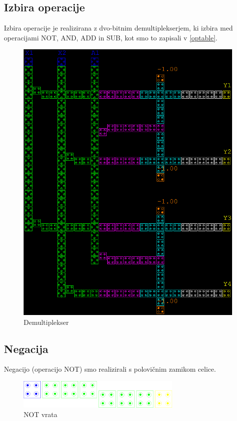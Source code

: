 \documentclass[seminar, slovene]{FRIreport}
\begin{document}
\subsection{Izbira operacije}
Izbira operacije je realizirana z dvo-bitnim demultiplekserjem, ki izbira med operacijami NOT, AND, ADD in SUB, kot smo to zapisali v \autoref{optable}.
\begin{figure}[h!]
\includegraphics[width=15cm]{qca/img/demux}
\caption{Demultiplekser}
\label{demux}
\end{figure}

\subsection{Negacija}
Negacijo (operacijo NOT) smo realizirali s polovičnim zamikom celice.
\begin{figure}[h!]
\begin{center}
\includegraphics[width=8cm]{qca/img/NOT}
\caption{NOT vrata}
\label{NOT}
\end{center}
\end{figure}
\end{document}
